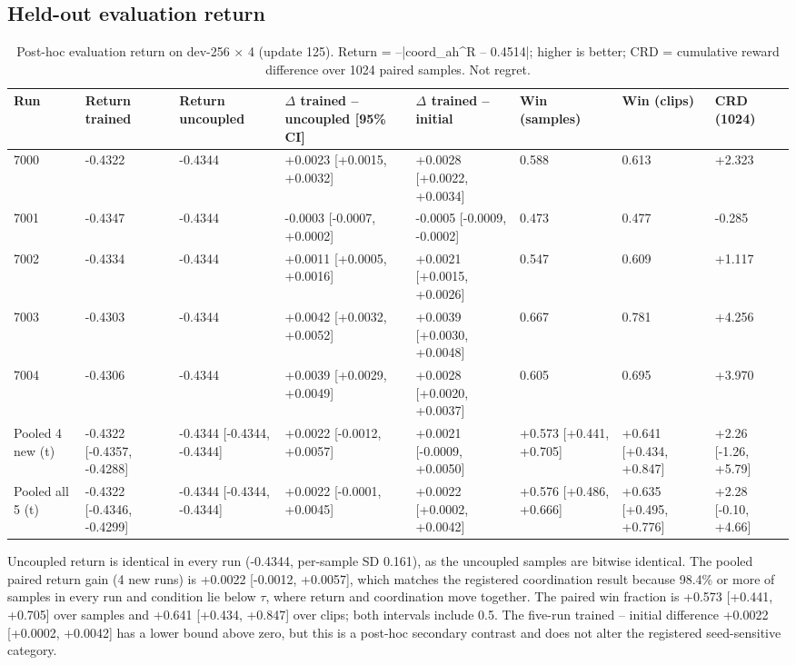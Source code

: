 \documentclass[conference]{IEEEtran}
\begin{document}
\subsection{Held-out evaluation return}
\begin{table}[t]\centering\caption{Post-hoc evaluation return on dev-256 $\times$ 4 (update 125). Return = --|coord\_ah\textasciicircum{}R -- 0.4514|; higher is better; CRD = cumulative reward difference over 1024 paired samples. Not regret.}\footnotesize\begin{tabular}{llllllll}\toprule \textbf{Run} & \textbf{Return trained} & \textbf{Return uncoupled} & \textbf{$\Delta$ trained -- uncoupled [95\% CI]} & \textbf{$\Delta$ trained -- initial} & \textbf{Win (samples)} & \textbf{Win (clips)} & \textbf{CRD (1024)} \\ \midrule 7000 & -0.4322 & -0.4344 & +0.0023 [+0.0015, +0.0032] & +0.0028 [+0.0022, +0.0034] & 0.588 & 0.613 & +2.323 \\ 7001 & -0.4347 & -0.4344 & -0.0003 [-0.0007, +0.0002] & -0.0005 [-0.0009, -0.0002] & 0.473 & 0.477 & -0.285 \\ 7002 & -0.4334 & -0.4344 & +0.0011 [+0.0005, +0.0016] & +0.0021 [+0.0015, +0.0026] & 0.547 & 0.609 & +1.117 \\ 7003 & -0.4303 & -0.4344 & +0.0042 [+0.0032, +0.0052] & +0.0039 [+0.0030, +0.0048] & 0.667 & 0.781 & +4.256 \\ 7004 & -0.4306 & -0.4344 & +0.0039 [+0.0029, +0.0049] & +0.0028 [+0.0020, +0.0037] & 0.605 & 0.695 & +3.970 \\ Pooled 4 new (t) & -0.4322 [-0.4357, -0.4288] & -0.4344 [-0.4344, -0.4344] & +0.0022 [-0.0012, +0.0057] & +0.0021 [-0.0009, +0.0050] & +0.573 [+0.441, +0.705] & +0.641 [+0.434, +0.847] & +2.26 [-1.26, +5.79] \\ Pooled all 5 (t) & -0.4322 [-0.4346, -0.4299] & -0.4344 [-0.4344, -0.4344] & +0.0022 [-0.0001, +0.0045] & +0.0022 [+0.0002, +0.0042] & +0.576 [+0.486, +0.666] & +0.635 [+0.495, +0.776] & +2.28 [-0.10, +4.66] \\ \bottomrule\end{tabular}\end{table}
Uncoupled return is identical in every run (-0.4344, per-sample SD 0.161), as the uncoupled samples are bitwise identical. The pooled paired return gain (4 new runs) is +0.0022 [-0.0012, +0.0057], which matches the registered coordination result because 98.4\% or more of samples in every run and condition lie below $\tau$, where return and coordination move together. The paired win fraction is +0.573 [+0.441, +0.705] over samples and +0.641 [+0.434, +0.847] over clips; both intervals include 0.5. The five-run trained -- initial difference +0.0022 [+0.0002, +0.0042] has a lower bound above zero, but this is a post-hoc secondary contrast and does not alter the registered seed-sensitive category.
\end{document}
